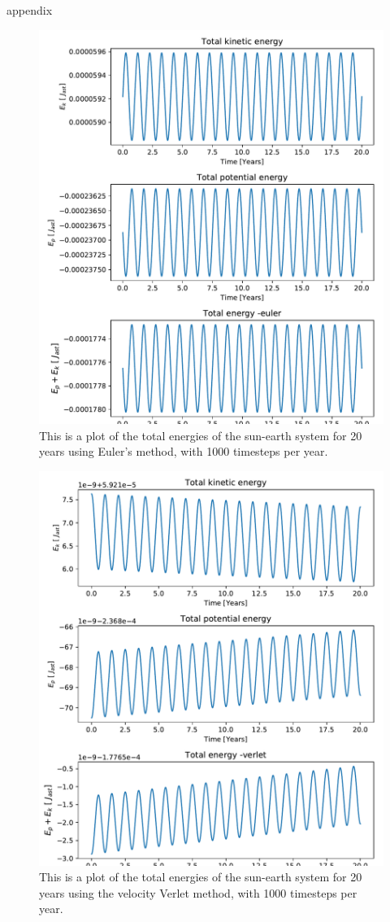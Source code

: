appendix


\begin{figure}[H]
\includegraphics[width=0.9\linewidth]{../results/plots/totalenergy_all-euler.pdf}\caption{This is a plot of the total energies of the sun-earth system for 20 years using Euler's method, with 1000 timesteps per year.}\label{fig:totalenergy_all-euler}
\end{figure}	

\begin{figure}[H]
\includegraphics[width=0.9\linewidth]{../results/plots/totalenergy_all-verlet.pdf}\caption{This is a plot of the total energies of the sun-earth system for 20 years using the velocity Verlet method, with 1000 timesteps per year.}\label{fig:totalenergy_all-verlet}
\end{figure}
